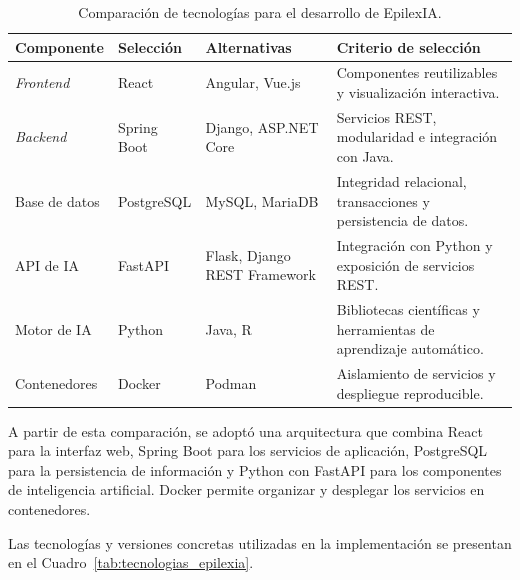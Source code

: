 \begin{table}[htbp]
\centering
\caption{Comparación de tecnologías para el desarrollo de EpilexIA.}
\label{tab:comparacion_tecnologias}
\scriptsize
\setlength{\tabcolsep}{3pt}
\renewcommand{\arraystretch}{1.15}

\begin{tabular}{|
>{\raggedright\arraybackslash}p{2.1cm}|
>{\raggedright\arraybackslash}p{2.4cm}|
>{\raggedright\arraybackslash}p{2.8cm}|
>{\raggedright\arraybackslash}p{3.6cm}|}
\hline
\textbf{Componente} &
\textbf{Selección} &
\textbf{Alternativas} &
\textbf{Criterio de selección} \\
\hline

\textit{Frontend} &
React &
Angular, Vue.js &
Componentes reutilizables y visualización interactiva. \\
\hline

\textit{Backend} &
Spring Boot &
Django, ASP.NET Core &
Servicios REST, modularidad e integración con Java. \\
\hline

Base de datos &
PostgreSQL &
MySQL, MariaDB &
Integridad relacional, transacciones y persistencia de datos. \\
\hline

API de IA &
FastAPI &
Flask, Django REST Framework &
Integración con Python y exposición de servicios REST. \\
\hline

Motor de IA &
Python &
Java, R &
Bibliotecas científicas y herramientas de aprendizaje automático. \\
\hline

Contenedores &
Docker &
Podman &
Aislamiento de servicios y despliegue reproducible. \\
\hline

\end{tabular}
\end{table}

A partir de esta comparación, se adoptó una
arquitectura que combina React para la interfaz
web, Spring Boot para los servicios de aplicación,
PostgreSQL para la persistencia de información
y Python con FastAPI para los componentes de
inteligencia artificial. Docker permite organizar
y desplegar los servicios en contenedores.

Las tecnologías y versiones concretas utilizadas
en la implementación se presentan en el
Cuadro~\ref{tab:tecnologias_epilexia}.

\begingroup
\small
\setlength{\tabcolsep}{3pt}
\renewcommand{\arraystretch}{1.08}
\setlength{\LTleft}{0pt}
\setlength{\LTright}{0pt}

